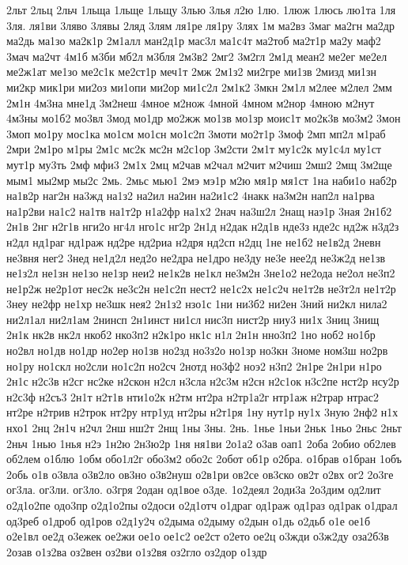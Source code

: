 {2льт
2льц
2льч
1льща
1льще
1льщу
3лью
3лья
л2ю
1лю.
1люж
1люсь
лю1та
1ля
3ля.
ля1ви
3ляво
3лявы
2ляд
3лям
ля1ре
ля1ру
3лях
1м
ма2вз
3маг
ма2гн
ма2др
ма2дь
ма1зо
ма2к1р
2м1алл
ман2д1р
мас3л
ма1с4т
ма2тоб
ма2т1р
ма2у
маф2
3мач
ма2чт
4м1б
м3би
мб2л
м3бля
2м3в2
2мг2
3м2гл
2м1д
меан2
ме2ег
ме2ел
ме2ж1ат
ме1зо
ме2с1к
ме2ст1р
меч1т
2мж
2м1з2
ми2гре
ми1зв
2мизд
ми1зн
ми2кр
мик1ри
ми2оз
ми1опи
ми2ор
ми1с2л
2м1к2
3мкн
2м1л
м2лее
м2лел
2мм
2м1н
4м3на
мне1д
3м2неш
4мное
м2нож
4мной
4мном
м2нор
4мною
м2нут
4м3ны
мо1б2
мо3вл
3мод
мо1др
мо2жж
мо1зв
мо1зр
моис1т
мо2к3в
мо3м2
3мон
3моп
мо1ру
мос1ка
мо1см
мо1сн
мо1с2п
3моти
мо2т1р
3моф
2мп
мп2л
м1раб
2мри
2м1ро
м1ры
2м1с
мс2к
мс2н
м2с1ор
3м2сти
2м1т
му1с2к
му1с4л
му1ст
мут1р
му3ть
2мф
мфи3
2м1х
2мц
м2чав
м2чал
м2чит
м2чиш
2мш2
2мщ
3м2ще
мым1
мы2мр
мы2с
2мь.
2мьс
мью1
2мэ
мэ1р
м2ю
мя1р
мя1ст
1на
наби1о
наб2р
на1в2р
наг2н
на3жд
на1з2
на2ил
на2ин
на2и1с2
4накк
на3м2н
нап2л
на1рва
на1р2ви
на1с2
на1тв
на1т2р
н1а2фр
на1х2
2нач
на3ш2л
2нащ
наэ1р
3ная
2н1б2
2н1в
2нг
н2г1в
нги2о
нг4л
нго1с
нг2р
2н1д
н2дак
н2д1в
нде3з
нде2с
нд2ж
н3д2з
н2дл
нд1раг
нд1раж
нд2ре
нд2риа
н2дря
нд2сп
н2дц
1не
не1б2
не1в2д
2невн
не3вня
нег2
3нед
не1д2л
нед2о
не2дра
не1дро
не3ду
не3е
нее2д
не3ж2д
не1зв
не1з2л
не1зн
не1зо
не1зр
неи2
не1к2в
не1кл
не3м2н
3не1о2
не2ода
не2ол
не3п2
не1р2ж
не2р1от
нес2к
не3с2н
не1с2п
нест2
не1с2х
не1с2ч
не1т2в
не3т2л
не1т2р
3неу
не2фр
не1хр
не3шк
нея2
2н1з2
нзо1с
1ни
ни3б2
ни2ен
3ний
ни2кл
нила2
ни2л1ал
ни2л1ам
2нинсп
2н1инст
ни1сл
нис3п
нист2р
ниу3
ни1х
3ниц
3нищ
2н1к
нк2в
нк2л
нкоб2
нко3п2
н2к1ро
нк1с
н1л
2н1н
нно3п2
1но
ноб2
но1бр
но2вл
но1дв
но1др
но2ер
но1зв
но2зд
но3з2о
но1зр
но3кн
3номе
ном3ш
но2рв
но1ру
но1скл
но2сли
но1с2п
но2сч
2нотд
но3ф2
ноэ2
н3п2
2н1ре
2н1ри
н1ро
2н1с
н2с3в
н2сг
нс2ке
н2скон
н2сл
н3сла
н2с3м
н2сн
н2с1ок
н3с2пе
нст2р
нсу2р
н2с3ф
н2съ3
2н1т
н2т1в
нти1о2к
н2тм
нт2ра
н2тр1а2г
нтр1аж
н2трар
нтрас2
нт2ре
н2трив
н2трок
нт2ру
нтр1уд
нт2ры
н2т1ря
1ну
нут1р
ну1х
3ную
2нф2
н1х
нхо1
2нц
2н1ч
н2чл
2нш
нш2т
2нщ
1ны
3ны.
2нь.
1нье
1ньи
2ньк
1ньо
2ньс
2ньт
2ньч
1нью
1нья
н2э
1н2ю
2н3ю2р
1ня
ня1ви
2о1а2
о3ав
оап1
2оба
2обио
об2лев
об2лем
о1блю
1обм
обо1л2г
обо3м2
обо2с
2обот
об1р
о2бра.
о1брав
о1бран
1объ
2обь
о1в
о3вла
о3в2ло
ов3но
о3в2нуш
о2в1ри
ов2се
ов3ско
ов2т
о2вх
ог2
2о3ге
ог3ла.
ог3ли.
ог3ло.
о3гря
2одан
од1вое
о3де.
1о2деял
2оди3а
2о3дим
од2лит
о2д1о2пе
одо3пр
о2д1о2пы
о2доси
о2д1отч
о1драг
од1раж
од1раз
од1рак
о1драл
од3реб
о1дроб
од1ров
о2д1у2ч
о2дыма
о2дыму
о2дын
о1дь
о2дьб
о1е
ое1б
о2е1вл
ое2д
о3ежек
ое2жи
ое1о
ое1с2
ое2ст
о2ето
ое2ц
о3жди
о3ж2ду
оза2б3в
2озав
о1з2ва
оз2вен
оз2ви
о1з2вя
оз2гло
оз2дор
о1здр
}
